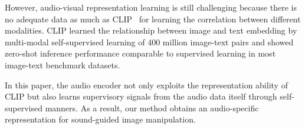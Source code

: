 \documentclass[10pt,twocolumn,letterpaper]{article}
\begin{document}
However, audio-visual representation learning is still challenging because there is no adequate data as much as CLIP~\cite{radford2learning} for learning the correlation between different modalities.
CLIP learned the relationship between image and text embedding by multi-modal self-supervised learning of 400 million image-text pairs and showed zero-shot inference performance comparable to supervised learning in most image-text benchmark datasets.  

In this paper, the audio encoder not only exploits the representation ability of CLIP but also learns supervisory signals from the audio data itself through self-supervised manners. As a result, our method obtains an audio-specific representation for sound-guided image manipulation.

\end{document}
